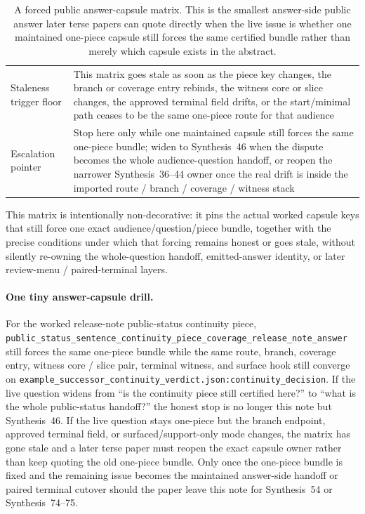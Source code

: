 \documentclass[11pt]{article}
\begin{document}
\begin{table}[t]
\begin{tabularx}{\linewidth}{@{}lX@{}}
Staleness trigger floor & This matrix goes stale as soon as the piece key changes, the branch or coverage entry rebinds, the witness core or slice changes, the approved terminal field drifts, or the start/minimal path ceases to be the same one-piece route for that audience \\
Escalation pointer & Stop here only while one maintained capsule still forces the same one-piece bundle; widen to Synthesis~46 when the dispute becomes the whole audience-question handoff, or reopen the narrower Synthesis~36--44 owner once the real drift is inside the imported route / branch / coverage / witness stack \\
\bottomrule
\end{tabularx}
\caption{A forced public answer-capsule matrix. This is the smallest answer-side public answer later terse papers can quote directly when the live issue is whether one maintained one-piece capsule still forces the same certified bundle rather than merely which capsule exists in the abstract.}
\label{tab:forced-public-answer-capsule-matrix}
\end{table}

This matrix is intentionally non-decorative: it pins the actual worked capsule keys that still force one exact audience/question/piece bundle, together with the precise conditions under which that forcing remains honest or goes stale, without silently re-owning the whole-question handoff, emitted-answer identity, or later review-menu / paired-terminal layers.\cite{series:workedexample}

\paragraph{One tiny answer-capsule drill.}
For the worked release-note public-status continuity piece, \nolinkurl{public_status_sentence_continuity_piece_coverage_release_note_answer} still forces the same one-piece bundle while the same route, branch, coverage entry, witness core / slice pair, terminal witness, and surface hook still converge on \nolinkurl{example_successor_continuity_verdict.json:continuity_decision}. If the live question widens from ``is the continuity piece still certified here?'' to ``what is the whole public-status handoff?'' the honest stop is no longer this note but Synthesis~46. If the live question stays one-piece but the branch endpoint, approved terminal field, or surfaced/support-only mode changes, the matrix has gone stale and a later terse paper must reopen the exact capsule owner rather than keep quoting the old one-piece bundle. Only once the one-piece bundle is fixed and the remaining issue becomes the maintained answer-side handoff or paired terminal cutover should the paper leave this note for Synthesis~54 or Synthesis~74--75.\cite{series:workedexample}
\end{document}
